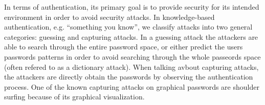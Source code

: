 

    In terms of authentication, its primary goal is to provide security for its intended environment in order to avoid security attacks. In knowledge-based authentication, e.g. ``something you know'', we classify attacks into two general categories: guessing and capturing attacks. In a guessing attack the attackers are able to search through the entire password space, or either predict the users passwords patterns in order to avoid searching through the whole passeords space (often refered to as a dictionary attack). When talking avbout capturing attacks, the attackers are directly obtain the passwords by observing the authentication process. One of the known capturing attacks on graphical passwords are shoulder surfing because of its graphical visualization. 







 
    